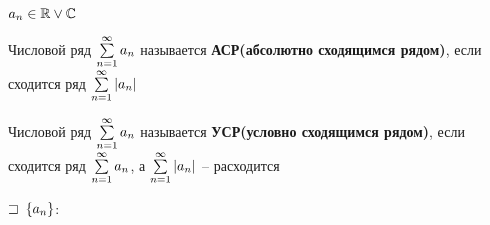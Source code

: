 
$a_n \in \mathbb{R} \vee \mathbb{C}$

\begin{defs}
	Числовой ряд $\sum\limits_{n=1}^{\infty}a_n$ называется \textbf{АСР(абсолютно сходящимся рядом)}, если сходится ряд $\sum\limits_{n=1}^{\infty}\left| a_n\right|$
\end{defs}

\begin{defs}
	Числовой ряд $\sum\limits_{n=1}^{\infty}a_n$ называется \textbf{УСР(условно сходящимся рядом)}, если сходится ряд $\sum\limits_{n=1}^{\infty}a_n$, а $\sum\limits_{n=1}^{\infty}\left| a_n\right|$ -- расходится
\end{defs}

\begin{proofs}
	$\sqsupset$ $\left\{ a_n\right\}$:

\end{proofs}
